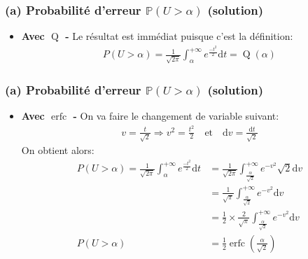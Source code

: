 \documentclass[11pt]{article}
\providecommand{\tightlist}{%
      \setlength{\itemsep}{0pt}\setlength{\parskip}{0pt}}
\begin{document}
    \hypertarget{a-probabilituxe9-derreur-mathbbpu-alpha-solution}{%
\subsubsection{\texorpdfstring{(a) Probabilité d'erreur
\(\mathbb{P}(U > \alpha)\)
(solution)}{(a) Probabilité d'erreur \textbackslash mathbb\{P\}(U \textgreater{} \textbackslash alpha) (solution)}}\label{a-probabilituxe9-derreur-mathbbpu-alpha-solution}}

\begin{itemize}
\tightlist
\item
  \textbf{Avec \(\operatorname{Q}\) -} Le résultat est immédiat puisque
  c'est la définition: \begin{align}
    P(U>\alpha) = \frac{1}{\sqrt{2 \pi}} \int_{\alpha}^{+\infty} e^{\frac{-t^{2}}{2}} \mathrm{d} t
                = \operatorname{Q}(\alpha)
  \end{align}
\end{itemize}


    \hypertarget{a-probabilituxe9-derreur-mathbbpu-alpha-solution}{%
\subsubsection{\texorpdfstring{(a) Probabilité d'erreur
\(\mathbb{P}(U > \alpha)\)
(solution)}{(a) Probabilité d'erreur \textbackslash mathbb\{P\}(U \textgreater{} \textbackslash alpha) (solution)}}\label{a-probabilituxe9-derreur-mathbbpu-alpha-solution}}

\begin{itemize}
\tightlist
\item
  \textbf{Avec \(\operatorname{erfc}\) -} On va faire le changement de
  variable suivant: \begin{align}
    v = \frac{t}{\sqrt{2}} \Rightarrow v^2 = \frac{t^2}{2}\quad\text{et}\quad \mathrm{d}v = \frac{\mathrm{d}t}{\sqrt{2}}
  \end{align} On obtient alors: \begin{align}
    P(U>\alpha) = \frac{1}{\sqrt{2 \pi}} \int_{\alpha}^{+\infty} e^{\frac{-t^{2}}{2}} \mathrm{d} t
                &= \frac{1}{\sqrt{2 \pi}} \int_{\frac{\alpha}{\sqrt{2}}}^{+\infty} e^{-v^2} \sqrt{2}\mathrm{d} v\\
                &= \frac{1}{\sqrt{\pi}} \int_{\frac{\alpha}{\sqrt{2}}}^{+\infty} e^{-v^2} \mathrm{d} v\\
                &= \frac{1}{2}\times\frac{2}{\sqrt{\pi}} \int_{\frac{\alpha}{\sqrt{2}}}^{+\infty} e^{-v^2} \mathrm{d} v\\
    P(U>\alpha) &= \frac{1}{2}\operatorname{erfc}\left(\frac{\alpha}{\sqrt{2}}\right)
  \end{align}
\end{itemize}
\end{document}
